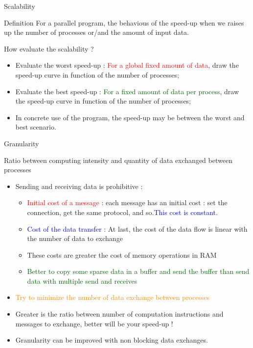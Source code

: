 \documentclass[compress,10pt,aspectratio=169]{beamer}
\begin{document}
\begin{frame}[fragile]{Scalability}
    \begin{block}{Definition}
        For a parallel program, the behavious of the speed-up when we raises up the number of processes or/and the amount 
        of input data. 
    \end{block}

    \begin{exampleblock}{How evaluate the scalability ?}
        \begin{itemize}
            \item Evaluate the worst speed-up : \textcolor{red}{For a global fixed amount of data}, draw the speed-up curve in function of the number of processes;
            \item Evaluate the best speed-up : \textcolor{DarkGreen}{For a fixed amount of data per process}, draw the speed-up curve in function of the number of processes;
            \item In concrete use of the program, the speed-up may be between the worst and best scenario.
        \end{itemize}
    \end{exampleblock}
\end{frame}

\begin{frame}[fragile]{Granularity}
    \scriptsize
    \begin{center}\small Ratio between computing intensity and quantity of data exchanged between processes\end{center}

    \begin{itemize}
        \item Sending and receiving data is prohibitive :
        \begin{itemize}
            \item {\scriptsize \textcolor{red}{Initial cost of a message} : each message has an initial cost : set the connection, 
                   get the same protocol, and so.\textcolor{blue}{This cost is constant.}} 
            \item {\scriptsize \textcolor{blue}{Cost of the data transfer} : At last, the cost of the data flow is linear with the number
            of data to exchange}
            \item {\scriptsize These costs are greater the cost of memory operations in RAM}
            \item \textcolor{DarkGreen}{\scriptsize Better to copy some sparse data in a buffer and send the buffer than send data with multiple send and receives}
        \end{itemize}
        \item \textcolor{darkorange}{Try to minimize the number of data exchange between processes}
        \item Greater is the ratio between number of computation instructions and messages to exchange, better will be your speed-up !
        \item \alert{Granularity can be improved with non blocking data exchanges}.
    \end{itemize}
\end{frame}
\end{document}
